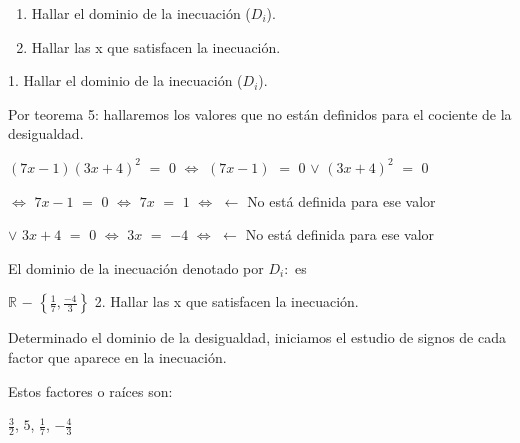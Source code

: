 \documentclass[12pt]{article}
\begin{document}
\begin{enumerate}
\item {\textcolor{coolgrey}{Hallar el dominio de la inecuación ($D_i$).}}
\item {\textcolor{coolgrey}{Hallar las x que satisfacen la inecuación.}}
\end{enumerate} \vspace{.6cm}

1. {\textcolor{coolgrey}{Hallar el dominio de la inecuación ($D_i$).}}\vspace{0.5cm}

Por {\textcolor{carrotorange}{teorema 5}}: hallaremos los valores que no están definidos para el cociente de la desigualdad. \vspace{0.5cm}

$(7x-1)(3x+4)^{2}$ $=$ $0$ $\Longleftrightarrow$ $(7x-1)$ $=$ $0$ $\vee$ $(3x+4)^{2}$ $=$ $0$\vspace{0.3cm}

$\Longleftrightarrow$ $7x-1$ $=$ $0$ $\Longleftrightarrow$ $7x$ $=$ $1$ $\Longleftrightarrow$  $\longleftarrow$ \hspace{0.1cm} {\footnotesize{No está definida para ese valor}} \vspace{0.3cm}

$\vee$  $3x+4$ $=$ $0$ $\Longleftrightarrow$ $3x$ $=$ $-4$ $\Longleftrightarrow$  $\longleftarrow$ \hspace{0.1cm} {\footnotesize{No está definida para ese valor}} \vspace{0.3cm}

El dominio de la inecuación denotado por $D_i:$ es \vspace{0.5cm}

\hspace{4cm} $\mathbb{R}$ $-$ {\LARGE{$\left\{\frac{1}{7}, \frac{-4}{3}\right\}$}} 
2. {\textcolor{coolgrey}{Hallar las x que satisfacen la inecuación.}}\vspace{0.5cm}

Determinado el dominio de la desigualdad, iniciamos el estudio de signos de cada factor que aparece en la inecuación.

Estos factores o raíces son: 

\begin{center}
    {\LARGE{$\frac{3}{2}$}}, $5$, {\LARGE{$\frac{1}{7}$}}, {\LARGE{$-\frac{4}{3}$}}
\end{center} \newpage
\end{document}

